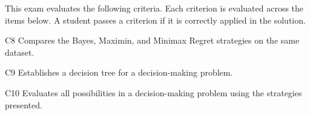 

	
	This exam evaluates the following criteria. Each criterion is evaluated across the items below. A student passes a criterion if it is correctly applied in the solution.
	\begin{ExamCriteria}
		\item C8 Compares the Bayes, Maximin, and Minimax Regret strategies on the same dataset.
		\item C9 Establishes a decision tree for a decision-making problem.
		\item C10 Evaluates all possibilities in a decision-making problem using the strategies presented.
	\end{ExamCriteria}
	
